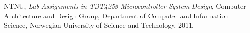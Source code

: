 \begin{thebibliography}{9}

    NTNU,
    \emph{Lab Assignments in TDT4258 Microcontroller System Design},
    Computer Architecture and Design Group,
    Department of Computer and Information Science,
    Norwegian University of Science and Technology,
    2011.

\end{thebibliography}
